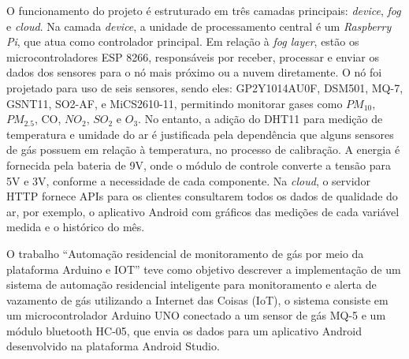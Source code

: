 O funcionamento do projeto é estruturado em três camadas principais: \textit{device}, \textit{fog} e \textit{cloud}. Na camada \textit{device}, 
a unidade de processamento central é um \textit{Raspberry Pi}, que atua como controlador principal. Em relação à \textit{fog layer}, estão os microcontroladores ESP 8266, responsáveis por receber, processar e 
enviar os dados dos sensores para o nó mais próximo ou a nuvem diretamente. O nó foi projetado para uso de seis sensores, sendo eles: GP2Y1014AU0F, DSM501, MQ-7, GSNT11, SO2-AF,
e MiCS2610-11, permitindo monitorar gases como $PM_{10}$, ${PM_{2.5}}$, CO, $NO_{2}$, $SO_{2}$ e $O_{3}$. No entanto, a adição do DHT11 para medição de temperatura e umidade do ar é justificada 
pela dependência que alguns sensores de gás possuem em relação à temperatura, no processo de calibração. A energia é fornecida pela bateria de 9V, onde o módulo de controle converte a tensão para 5V e 3V, conforme a 
necessidade de cada componente. Na \textit{cloud}, o servidor HTTP fornece APIs para os clientes consultarem todos os dados de qualidade do ar, por exemplo, o aplicativo Android com 
gráficos das medições de cada variável medida e o histórico do mês.

O trabalho ``Automação residencial de monitoramento de gás por meio da plataforma Arduino e IOT'' \cite{sistema-antivazamento} teve como objetivo descrever a implementação de um sistema de automação 
residencial inteligente para monitoramento e alerta de vazamento de gás utilizando a Internet das Coisas (IoT), o sistema consiste em um microcontrolador Arduino UNO 
conectado a um sensor de gás MQ-5 e um módulo bluetooth HC-05, que envia os dados para um aplicativo Android desenvolvido na plataforma Android Studio.